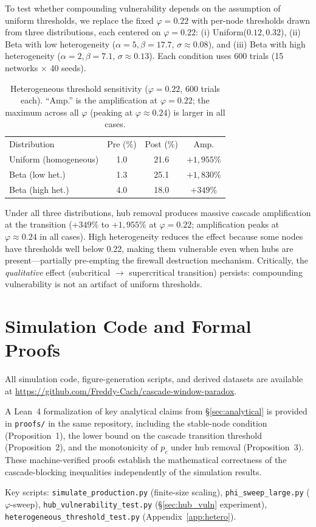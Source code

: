 \documentclass[aps,pre,twocolumn,superscriptaddress,showpacs]{revtex4-2}
\newcommand{\pc}{p_c}
\begin{document}
To test whether compounding vulnerability depends on the assumption of uniform thresholds, we replace the fixed $\varphi=0.22$ with per-node thresholds drawn from three distributions, each centered on $\varphi=0.22$: (i) Uniform($0.12, 0.32$), (ii) Beta with low heterogeneity ($\alpha=5, \beta=17.7$, $\sigma \approx 0.08$), and (iii) Beta with high heterogeneity ($\alpha=2, \beta=7.1$, $\sigma \approx 0.13$). Each condition uses 600 trials (15 networks $\times$ 40 seeds).

\begin{table}[h]
\caption{Heterogeneous threshold sensitivity ($\varphi=0.22$, 600 trials each). ``Amp.'' is the amplification at $\varphi=0.22$; the maximum across all $\varphi$ (peaking at $\varphi \approx 0.24$) is larger in all cases.}
\label{tab:hetero}
\begin{ruledtabular}
\begin{tabular}{lccc}
\textrm{Distribution} & \textrm{Pre (\%)} & \textrm{Post (\%)} & \textrm{Amp.} \\
\colrule
Uniform (homogeneous) & 1.0 & 21.6 & $+1{,}955\%$ \\
Beta (low het.) & 1.3 & 25.1 & $+1{,}830\%$ \\
Beta (high het.) & 4.0 & 18.0 & $+349\%$ \\
\end{tabular}
\end{ruledtabular}
\end{table}

Under all three distributions, hub removal produces massive cascade amplification at the transition ($+349\%$ to $+1{,}955\%$ at $\varphi=0.22$; amplification peaks at $\varphi \approx 0.24$ in all cases). High heterogeneity reduces the effect because some nodes have thresholds well below 0.22, making them vulnerable even when hubs are present---partially pre-empting the firewall destruction mechanism. Critically, the \emph{qualitative} effect (subcritical $\to$ supercritical transition) persists: compounding vulnerability is not an artifact of uniform thresholds.

\section{Simulation Code and Formal Proofs}
\label{app:code}

All simulation code, figure-generation scripts, and derived datasets are available at \url{https://github.com/Freddy-Cach/cascade-window-paradox}.

A Lean~4 formalization of key analytical claims from \S\ref{sec:analytical} is provided in \texttt{proofs/} in the same repository, including the stable-node condition (Proposition~1), the lower bound on the cascade transition threshold (Proposition~2), and the monotonicity of $\pc$ under hub removal (Proposition~3). These machine-verified proofs establish the mathematical correctness of the cascade-blocking inequalities independently of the simulation results.

Key scripts: \texttt{simulate\_production.py} (finite-size scaling), \texttt{phi\_sweep\_large.py} ($\varphi$-sweep), \texttt{hub\_vulnerability\_test.py} (\S\ref{sec:hub_vuln} experiment), \texttt{heterogeneous\_threshold\_test.py} (Appendix~\ref{app:hetero}).
\end{document}
